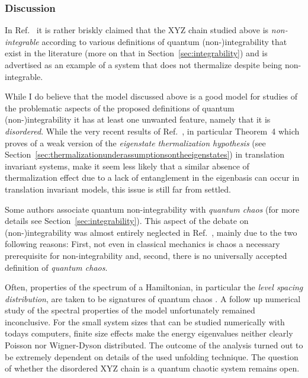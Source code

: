 \documentclass[a4paper,12pt,listof=totoc,index=totoc,bibliography=totoc,headsepline=false,headings=normal,BCOR16.153846mm,DIV12,headinclude,twoside,cleardoublepage=empty,numbers=noenddot,final]{scrreprt}
\theoremstyle{mystyle}
\numberwithin{equation}{section}
\numberwithin{figure}{section}
\numberwithin{lemma}{section}
\numberwithin{theorem}{section}
\numberwithin{corollary}{section}
\numberwithin{definition}{section}
\numberwithin{conjecture}{section}
\numberwithin{observation}{section}
\newcommand{\+}{\mkern2mu}
\DeclareMathOperator{\1}{\mathds{1}}
\begin{document}
\vspace{1em} %
\subsubsection*{Discussion}
%
In Ref.~\cite{PhysRevLett.10-6} it is rather briskly claimed that the XYZ chain studied above is \emph{non-integrable} according to various definitions of quantum (non-)integrability that exist in the literature (more on that in Section~\ref{sec:integrability}) and is advertised as an example of a system that does not thermalize despite being non-integrable.

While I do believe that the model discussed above is a good model for studies of the problematic aspects of the proposed definitions of quantum (non-)integrability it has at least one unwanted feature, namely that it is \emph{disordered}.
While the very recent results of Ref.~\cite{Mueller2013}, in particular Theorem~4 which proves of a weak version of the \emph{eigenstate thermalization hypothesis} (see Section~\ref{sec:thermalizationunderassumptionsontheeigenstates}) in translation invariant systems, make it seem less likely that a similar absence of thermalization effect due to a lack of entanglement in the eigenbasis can occur in translation invariant models, this issue is still far from settled.

Some authors associate quantum non-integrability with \emph{quantum chaos} (for more details see Section~\ref{sec:integrability}).
This aspect of the debate on (non-)integrability was almost entirely neglected in Ref.~\cite{PhysRevLett.10-6}, mainly due to the two following reasons:
First, not even in classical mechanics is chaos a necessary prerequisite for non-integrability and, second, there is no universally accepted definition of \emph{quantum chaos}.

Often, properties of the spectrum of a Hamiltonian, in particular the \emph{level spacing distribution}, are taken to be signatures of quantum chaos \cite{Haake10}.
A follow up numerical study of the spectral properties of the model unfortunately remained inconclusive.
For the small system sizes that can be studied numerically with todays computers, finite size effects make the energy eigenvalues neither clearly Poisson nor Wigner-Dyson distributed.
The outcome of the analysis turned out to be extremely dependent on details of the used unfolding technique.
The question of whether the disordered XYZ chain is a quantum chaotic system remains open.
\end{document}
